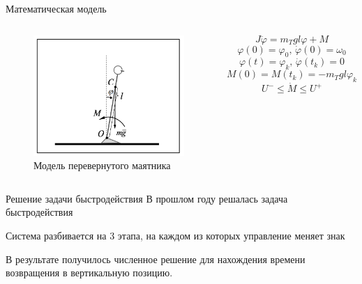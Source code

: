 \documentclass[10pt]{beamer}
\begin{document}
\begin{frame}{Математическая модель}
	\begin{columns}
		\begin{figure}[h!]
			\includegraphics[width=1\linewidth]{images/inverse_pendulum.png}
			\caption{Модель перевернутого маятника}
		\end{figure}

		\[
			J\ddot{\varphi}=m_Tgl\varphi+M
		\]
		\[
			\varphi(0)=\varphi_0,\, \dot{\varphi}(0)=\omega_0
		\]
		\[
			\varphi(t)=\varphi_k,\, \dot{\varphi}(t_k)=0
		\]
		\[
			M(0)=M(t_k)=-m_Tgl\varphi_k
		\]
		\[
			U^-\leq\dot{M}\leq U^+
		\]
	\end{columns}
\end{frame}
\begin{frame}{Решение задачи быстродействия}
	В прошлом году решалась задача быстродействия

	Система разбивается на 3 этапа, на каждом из которых управление меняет знак

	В результате получилось численное решение для нахождения времени возвращения в вертикальную позицию.
\end{frame}
\end{document}
